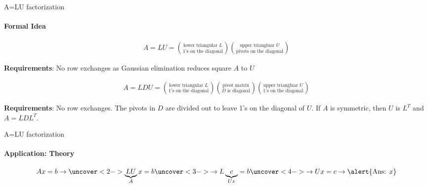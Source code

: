 \documentclass[aspectratio=169]{beamer}
\begin{document}
\begin{frame}[t]{A=LU factorization}
    \framesubtitle{Formal Idea}
    \vspace{-0.5cm}
    \begin{align*}
        A=LU=\binom{\text{lower triangular $L$}}{\text{1's on the diagonal}}\binom{\text{upper triangluar $U$}}{\text{pivots on the diagonal}}
    \end{align*}

    \textbf{Requirements}: No row exchanges as Gaussian elimination reduces square $A$ to $U$
    \medskip

    \begin{align*}
        A=LDU=\binom{\text{lower triangular $L$}}{\text{1's on the diagonal}}\binom{\text{pivot matrix}}{\text{$D$ is diagonal}}\binom{\text{upper triangluar $U$}}{\text{1's on the diagonal}}
    \end{align*}

    \textbf{Requirements}: No row exchanges. The pivots in $D$ are divided out to leave 1's on the diagonal of $U$. If $A$ is symmetric, then $U$ is $L^T$ and $A=LDL^T$.
\end{frame}

\begin{frame}[c]{A=LU factorization}
    \framesubtitle{Application: Theory}
    \Large
    \begin{equation*}
        Ax=b \rightarrow \uncover<2->{\underbrace{LU}_{A}x=b}\uncover<3->{ \rightarrow L\underbrace{c}_{Ux}=b}\uncover<4->{\rightarrow Ux=c \rightarrow \alert{\text{Ans: }x}}
    \end{equation*}
\end{frame}

\end{document}
